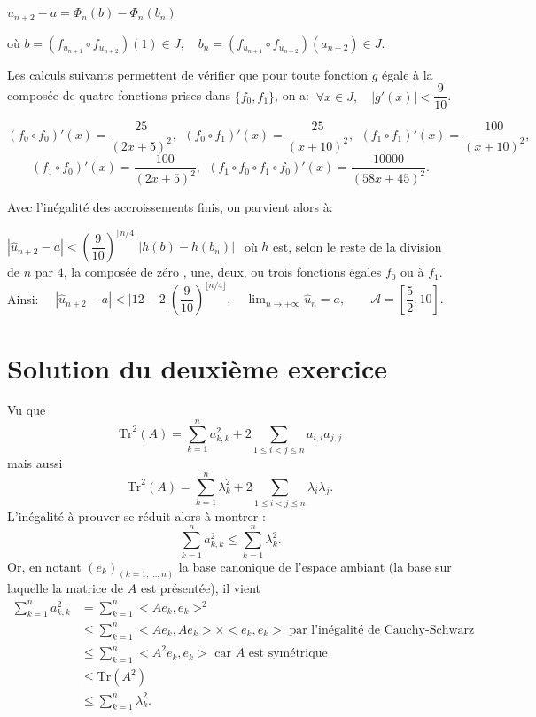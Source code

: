 $\widehat u_{n+2} -a = \Phi _n (b) - \Phi _n (b_n)\quad$ 

où $b =\left (f_{u_{n+1}} \circ f_{u_{n+2}}\right) (1) \in J,\quad  b_n =\left(f_{u_{n+1}} \circ f_{u_{n+2}} \right) (a_{n+2} )\in J.$ 

Les calculs suivants permettent de vérifier que pour toute fonction $g$ égale à la composée de quatre fonctions prises dans $\{f_0 , f_1\} $, on a: $\:\forall x \in J, \quad | g'(x) | < \dfrac 9{10} $.  
 
    $$(f_0 \circ f_0)'(x)=\dfrac {25}{(2x +5)^2},\:\: ( f_0 \circ f_1)'(x) = \dfrac {25}{(x+10)^2},\:\: ( f_1 \circ f_1)'(x) = \dfrac {100}{(x+10)^2},\: \:$$  
    $$(f_1\circ f_0)'(x) = \dfrac {100}{(2x+5)^2},\:\: 
    (f_1 \circ f_0\circ f_1 \circ f_0)'(x) = \dfrac {10000}{(58x+45)^2}.$$ 
  
   
Avec l'inégalité des accroissements finis, on parvient alors à: 

$|\widehat u _{n+2} -a | < \left(\dfrac 9{10} \right) ^{\lfloor n/4\rfloor} \Big|h (b) - h(b_n) \Big |\:\:$ où $h$ est, selon le reste de la division de $n$ par $4$, la  composée de zéro , une, deux, ou trois fonctions égales $ f_0$  ou à $f_1$.
Ainsi: $\quad |\widehat u_{n+2} -a |<| 12 - 2| \left(\dfrac 9{10} \right) ^{\lfloor n/4 \rfloor}, \quad \displaystyle \lim_{n \to + \infty} \widehat u_n =a, \qquad \boxed {\mathcal A =\left[ \dfrac 52, 10 \right ].}$ 














\section{Solution du deuxième exercice}

Vu que $$\mbox{Tr}^{2}(A)=\sum_{k=1}^{n}a_{k,k}^{2}+2\sum_{1\leq i<j\leq n}a_{i,i}a_{j,j}$$ mais aussi $$\mbox{Tr}^{2}(A)=\sum_{k=1}^{n}\lambda_{k}^{2}+2\sum_{1\leq i<j\leq n}\lambda_{i}\lambda_{j}.$$
L'inégalité à prouver se réduit alors à montrer : $$\sum_{k=1}^{n}a_{k,k}^{2}\leq \sum_{k=1}^{n}\lambda_{k}^{2}.$$
Or, en notant $(e_{k})_{(k=1,\ldots,n)}$ la base canonique de l'espace ambiant (la base sur laquelle la matrice de $A$ est présentée), il vient
\begin{align*}
\sum_{k=1}^{n}a_{k,k}^{2} & = \sum_{k=1}^{n}<Ae_{k},e_{k}>^{2}\\
& \leq \sum_{k=1}^{n}<Ae_{k},Ae_{k}>\times <e_{k},e_{k}> \mbox{  par l'inégalité de Cauchy-Schwarz }\\
& \leq \sum_{k=1}^{n}<A^{2}e_{k},e_{k}> \mbox{ car } A \mbox{ est symétrique}\\
& \leq \mbox{Tr}(A^{2})\\
& \leq \sum_{k=1}^{n}\lambda_{k}^{2}. 
\end{align*}
 